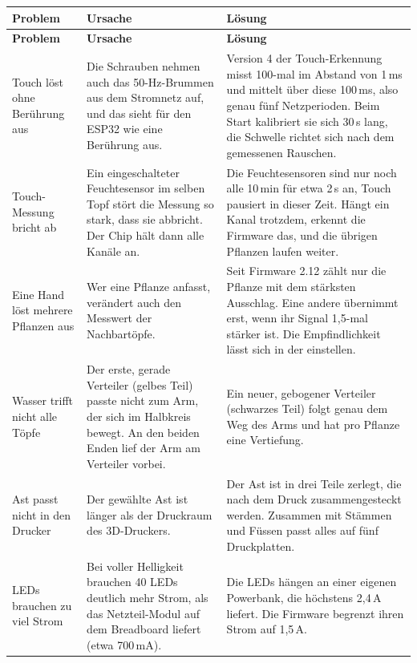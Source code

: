 \documentclass[11pt,a4paper]{article}
\begin{document}
{\small
\begin{xltabular}{\linewidth}{>{\raggedright\arraybackslash}p{3.3cm}>{\raggedright\arraybackslash}p{5.4cm}L}
\toprule
\textbf{Problem} & \textbf{Ursache} & \textbf{Lösung} \\
\midrule
\endfirsthead
\toprule
\textbf{Problem} & \textbf{Ursache} & \textbf{Lösung} \\
\midrule
\endhead
\bottomrule
\endlastfoot
Touch löst ohne Berührung aus & Die Schrauben nehmen auch das 50-Hz-Brummen aus dem Stromnetz auf, und das sieht für den ESP32 wie eine Berührung aus. & Version 4 der Touch-Erkennung misst 100-mal im Abstand von 1\,ms und mittelt über diese 100\,ms, also genau fünf Netzperioden. Beim Start kalibriert sie sich 30\,s lang, die Schwelle richtet sich nach dem gemessenen Rauschen. \\
\addlinespace
Touch-Messung bricht ab & Ein eingeschalteter Feuchtesensor im selben Topf stört die Messung so stark, dass sie abbricht. Der Chip hält dann alle Kanäle an. & Die Feuchtesensoren sind nur noch alle 10\,min für etwa 2\,s an, Touch pausiert in dieser Zeit. Hängt ein Kanal trotzdem, erkennt die Firmware das, und die übrigen Pflanzen laufen weiter. \\
\addlinespace
Eine Hand löst mehrere Pflanzen aus & Wer eine Pflanze anfasst, verändert auch den Messwert der Nachbartöpfe. & Seit Firmware 2.12 zählt nur die Pflanze mit dem stärksten Ausschlag. Eine andere übernimmt erst, wenn ihr Signal 1,5-mal stärker ist. Die Empfindlichkeit lässt sich in der  einstellen. \\
\addlinespace
Wasser trifft nicht alle Töpfe & Der erste, gerade Verteiler (gelbes Teil) passte nicht zum Arm, der sich im Halbkreis bewegt. An den beiden Enden lief der Arm am Verteiler vorbei. & Ein neuer, gebogener Verteiler (schwarzes Teil) folgt genau dem Weg des Arms und hat pro Pflanze eine Vertiefung. \\
\addlinespace
Ast passt nicht in den Drucker & Der gewählte Ast ist länger als der Druckraum des 3D-Druckers. & Der Ast ist in drei Teile zerlegt, die nach dem Druck zusammengesteckt werden. Zusammen mit Stämmen und Füssen passt alles auf fünf Druckplatten. \\
\addlinespace
LEDs brauchen zu viel Strom & Bei voller Helligkeit brauchen 40 LEDs deutlich mehr Strom, als das Netzteil-Modul auf dem Breadboard liefert (etwa 700\,mA). & Die LEDs hängen an einer eigenen Powerbank, die höchstens 2,4\,A liefert. Die Firmware begrenzt ihren Strom auf 1,5\,A. \\

\end{xltabular}}
\end{document}
